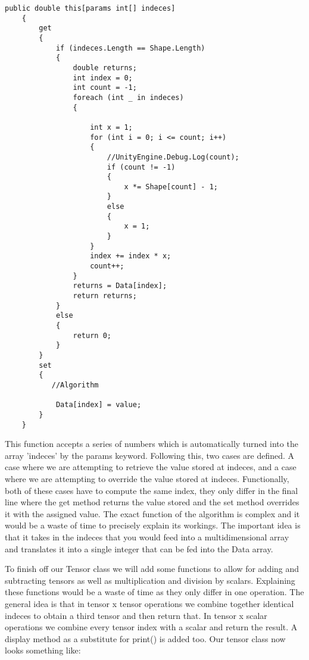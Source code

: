 \documentclass{article}
\begin{document}
\newpage
\begin{verbatim}
public double this[params int[] indeces]
    {
        get
        {
            if (indeces.Length == Shape.Length)
            {
                double returns;
                int index = 0;
                int count = -1;
                foreach (int _ in indeces)
                {

                    int x = 1;
                    for (int i = 0; i <= count; i++)
                    {
                        //UnityEngine.Debug.Log(count);
                        if (count != -1)
                        {
                            x *= Shape[count] - 1;
                        }
                        else
                        {
                            x = 1;
                        }
                    }
                    index += index * x;
                    count++;
                }
                returns = Data[index];
                return returns;
            }
            else
            {
                return 0;
            }
        }
        set
        {
           //Algorithm

            Data[index] = value;
        }
    }
\end{verbatim}

This function accepts a series of numbers which is automatically turned into the array 'indeces' by the params keyword. Following this, two cases are defined. A case where we are attempting to retrieve the value stored at indeces, and a case where we are attempting to override the value stored at indeces. Functionally, both of these cases have to compute the same index, they only differ in the final line where the get method returns the value stored and the set method overrides it with the assigned value. The exact function of the algorithm is complex and it would be a waste of time to precisely explain its workings. The important idea is that it takes in the indeces that you would feed into a multidimensional array and translates it into a single integer that can be fed into the Data array. 

To finish off our Tensor class we will add some functions to allow for adding and subtracting tensors as well as multiplication and division by scalars. Explaining these functions would be a waste of time as they only differ in one operation. The general idea is that in tensor x tensor operations we combine together identical indeces to obtain a third tensor and then return that. In tensor x scalar operations we combine every tensor index with a scalar and return the result. A display method as a substitute for print() is added too. Our tensor class now looks something like:
\end{document}
